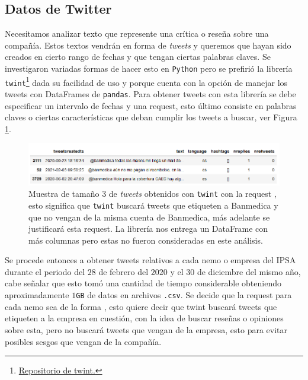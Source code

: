 \documentclass{article}
\begin{document}
\subsection{Datos de Twitter}
Necesitamos analizar texto que represente una crítica o reseña sobre una compañía. Estos textos vendrán en forma de \textit{tweets} y queremos que hayan sido creados en cierto rango de fechas y que tengan ciertas palabras claves. Se investigaron variadas formas de hacer esto en \texttt{Python} pero se prefirió la librería \texttt{twint}\footnote{\href{https://github.com/twintproject/twint}{Repositorio de twint.}} dada su facilidad de uso y porque cuenta con la opción de manejar los tweets con DataFrames de \texttt{pandas}. Para obtener tweets con esta librería se debe especificar un intervalo de fechas y una request, esto último consiste en palabras claves o ciertas características que deban cumplir los tweets a buscar, ver Figura \ref{fig:twint_example}.
\begin{figure}[H]
	\centering
	\includegraphics[scale=.65]{imgs/twint_example.png}
	\caption{Muestra de tamaño $3$ de \textit{tweets} obtenidos con \texttt{twint} con la request , esto significa que \texttt{twint} buscará tweets que etiqueten a Banmedica y que no vengan de la misma cuenta de Banmedica, más adelante se justificará esta request. La librería nos entrega un DataFrame con más columnas pero estas no fueron consideradas en este análisis.}
	\label{fig:twint_example}
\end{figure}
Se procede entonces a obtener tweets relativos a cada nemo o empresa del IPSA durante el periodo del $28$ de febrero del $2020$ y el $30$ de diciembre del mismo año, cabe señalar que esto tomó una cantidad de tiempo considerable obteniendo aproximadamente $1$\texttt{GB} de datos en archivos \texttt{.csv}. Se decide que la request para cada nemo sea de la forma , esto quiere decir que twint buscará tweets que etiqueten a la empresa en cuestión, con la idea de buscar reseñas o opiniones sobre esta, pero no buscará tweets que vengan de la empresa, esto para evitar posibles sesgos que vengan de la compañía.
\end{document}

